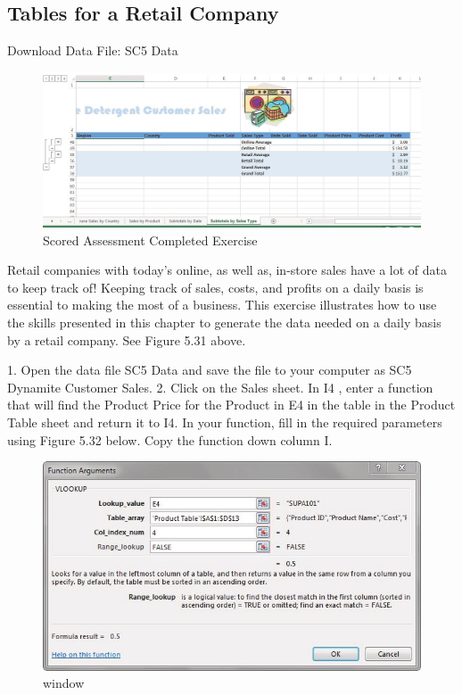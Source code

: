 \subsection{Tables for a Retail Company}

Download Data File: SC5 Data


\begin{figure}[H]
	\centering
	\includegraphics[width=\maxwidth{.95\linewidth}]{gfx/ch05_fig31}
	\caption{Scored Assessment Completed Exercise}
	\label{05:fig31}
\end{figure}



Retail companies with today’s online, as well as, in-store sales have a lot of data to keep track of!
Keeping track of sales, costs, and profits on a daily basis is essential to making the most of a business.
This exercise illustrates how to use the skills presented in this chapter to generate the data needed on
a daily basis by a retail company. See Figure 5.31 above.

1. Open the data file SC5 Data and save the file to your computer as SC5 Dynamite Customer
Sales.
2. Click on the Sales sheet. In I4 , enter a  function that will find the Product Price for
the Product in E4 in the table in the Product Table sheet and return it to I4. In your 
function, fill in the required parameters using Figure 5.32 below. Copy the  function
down column I.


\begin{figure}[H]
	\centering
	\includegraphics[width=\maxwidth{.95\linewidth}]{gfx/ch05_fig32}
	\caption{ window}
	\label{05:fig32}
\end{figure}






